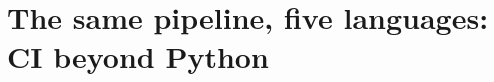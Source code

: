 \chapter{The same pipeline, five languages: CI beyond Python}
\label{ch:the-same-pipeline-five-languages-ci}

